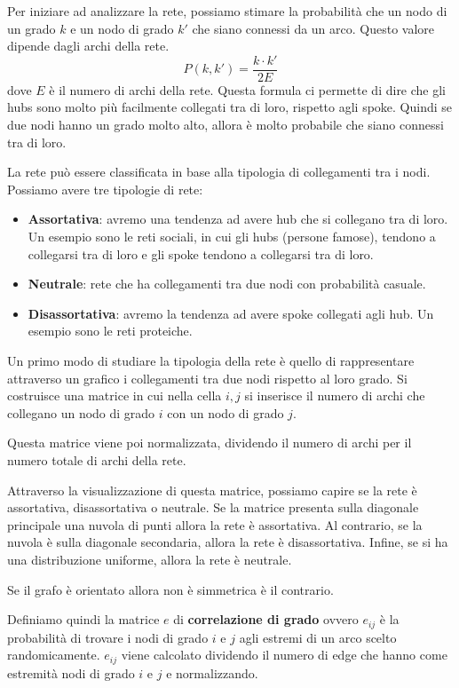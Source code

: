 Per iniziare ad analizzare la rete, possiamo stimare la probabilità che un nodo
di un grado $k$ e un nodo di grado $k'$ che siano connessi da un arco. Questo
valore dipende dagli archi della rete.
\begin{equation}
    P(k, k') = \frac{k \cdot k'}{2E}
\end{equation}
dove $E$ è il numero di archi della rete. Questa formula ci permette di dire che
gli hubs sono molto più facilmente collegati tra di loro, rispetto agli spoke.
Quindi se due nodi hanno un grado molto alto, allora è molto probabile che siano
connessi tra di loro.

La rete può essere classificata in base alla tipologia di collegamenti tra i nodi.
Possiamo avere tre tipologie di rete:
\begin{itemize}
    \item \textbf{Assortativa}: avremo una tendenza ad avere hub che si collegano
          tra di loro. Un esempio sono le reti sociali, in cui gli hubs (persone
          famose), tendono a collegarsi tra di loro e gli spoke tendono a collegarsi tra di loro.
    \item \textbf{Neutrale}: rete che ha collegamenti tra due nodi con probabilità
          casuale.
    \item \textbf{Disassortativa}: avremo la tendenza ad avere spoke collegati
          agli hub. Un esempio sono le reti proteiche.
\end{itemize}
Un primo modo di studiare la tipologia della rete è quello di rappresentare
attraverso un grafico i collegamenti tra due nodi rispetto al loro grado. Si
costruisce una matrice in cui nella cella $i, j$ si inserisce il numero di archi
che collegano un nodo di grado $i$ con un nodo di grado $j$.

Questa matrice viene poi normalizzata, dividendo il numero di archi per il numero
totale di archi della rete.

Attraverso la visualizzazione di questa matrice, possiamo capire se la rete è
assortativa, disassortativa o neutrale. Se la matrice presenta sulla diagonale
principale una nuvola di punti allora la rete è assortativa. Al contrario, se
la nuvola è sulla diagonale secondaria, allora la rete è disassortativa. Infine,
se si ha una distribuzione uniforme, allora la rete è neutrale.
\begin{nota}
    Se il grafo è orientato allora non è simmetrica è il contrario.
\end{nota}

Definiamo quindi la matrice $e$ di \textbf{correlazione di grado} ovvero $e_{ij}$
è la probabilità di trovare i nodi di grado $i$ e $j$ agli estremi di un arco scelto 
randomicamente. $e_{ij}$ viene calcolato dividendo il numero di edge che hanno come 
estremità nodi di grado $i$ e $j$ e normalizzando.


